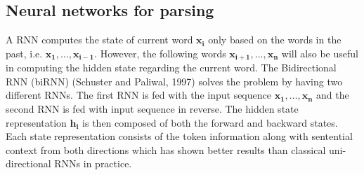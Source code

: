 \documentclass[a4paper, 11pt]{article}
\begin{document}

\subsection{Neural networks for parsing }

A RNN computes the state of current word $\mathbf{x_{i}}$ only based on the words in the past, i.e. $\mathrm{\mathbf{x_1},\dots,\mathbf{x_{i-1}}}$. However, the following words $\mathrm{\mathbf{x_{i+1}},\dots,\mathbf{x_{n}}}$ will also be useful in computing the hidden state regarding the current word. The Bidirectional RNN (biRNN) (Schuster and Paliwal, 1997) solves the problem by having two different RNNs. The first RNN is fed with the input sequence $\mathrm{\mathbf{x_{1}},\dots,\mathbf{x_{n}}}$ and the second RNN is fed with input sequence in reverse. The hidden state representation $\mathbf{h_{i}}$ is then composed of both the forward and backward states. Each state representation consists of the token information along with sentential context from both directions which has shown better results than classical uni-directional RNNs in practice.
\end{document}
